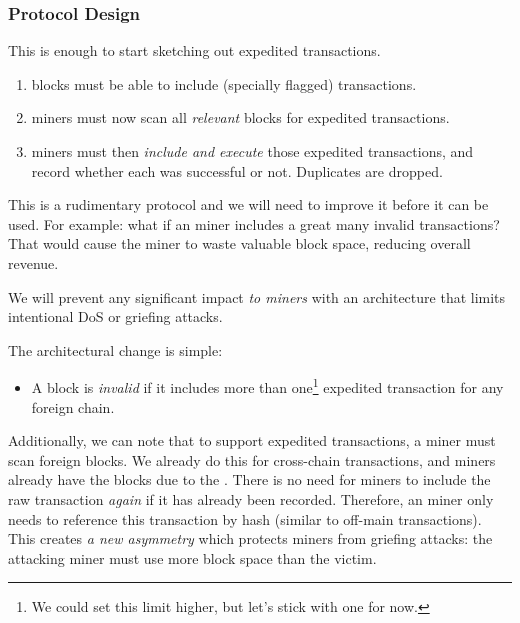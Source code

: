 \subsubsection{Protocol Design}

This is enough to start sketching out expedited transactions.
\begin{enumerate}
    \item \cR blocks must be able to include (specially flagged) \cL transactions.
    \item \cL miners must now scan all \emph{relevant} \cR blocks for expedited \cL transactions.
    \item \cL miners must then \emph{include and execute} those expedited transactions, and record whether each was successful or not. Duplicates are dropped.
\end{enumerate}

This is a rudimentary protocol and we will need to improve it before it can be used.
For example: what if an \cR miner includes a great many invalid \cL transactions?
That would cause the \cL miner to waste valuable block space, reducing overall revenue.


We will prevent any significant impact \emph{to miners} with an architecture that limits intentional DoS or griefing attacks.

The architectural change is simple:
\begin{itemize}
    \item A block is \emph{invalid} if it includes more than one\footnote{We could set this limit higher, but let's stick with one for now.} expedited transaction for any foreign chain.
\end{itemize}

Additionally, we can note that to support expedited transactions, a miner must scan foreign blocks.
We already do this for cross-chain transactions, and miners already have the blocks due to the \AxiomOfAvailability.
There is no need for miners to include the raw transaction \emph{again} if it has already been recorded.
Therefore, an \cL miner only needs to reference this transaction by hash (similar to off-main transactions).
This creates \emph{a new asymmetry} which protects miners from griefing attacks: the attacking miner must use more block space than the victim.


